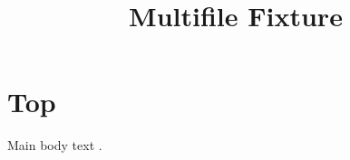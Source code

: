 \documentclass{article}
\title{Multifile Fixture}
\begin{document}
\section{Top}\label{sec:top}
Main body text \cite{delta}.


\end{document}
